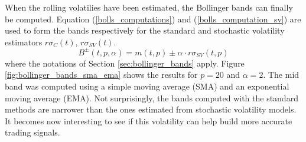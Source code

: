 \documentclass[11pt,a4,twosided,singlespacing,titlepagenumber=on]{scrreprt}
\numberwithin{equation}{chapter} %
\theoremstyle{remark}
\begin{document}
When the rolling volatilies have been estimated, the Bollinger bands can finally be computed. Equation (\ref{bolls_computations}) and (\ref{bolls_computation_sv}) are used to form the bands respectively for the standard and stochastic volatility estimators $r\sigma_C(t)$, $r\sigma_{SV}(t)$.
\begin{equation}
\label{bolls_computation_sv}
B^\pm(t,p,\alpha) = m(t,p) \pm \alpha \cdot r\sigma_{SV}(t,p)
\end{equation}
where the notations of Section \ref{sec:bollinger_bands} apply. Figure \ref{fig:bollinger_bands_sma_ema} shows the results for $p=20$ and $\alpha = 2$. The mid band was computed using a simple moving average (SMA) and an exponential moving average (EMA). Not surprisingly, the bands computed with the standard methods are narrower than the ones estimated from stochastic volatility models. It becomes now interesting to see if this volatility can help build more accurate trading signals.
\end{document}
